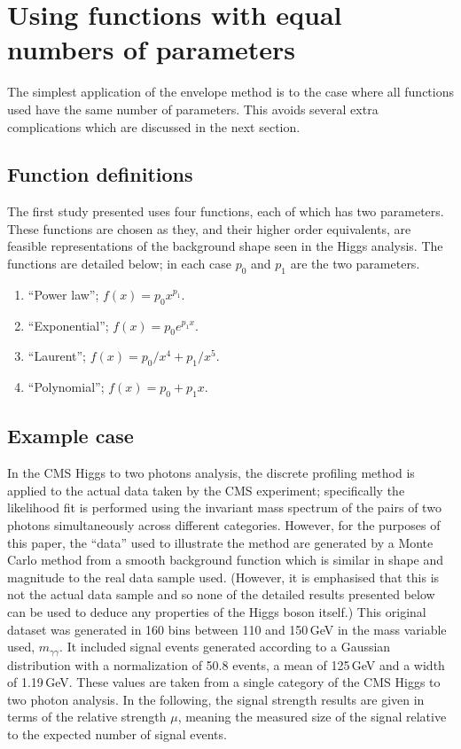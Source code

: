 \section{Using functions with equal numbers of parameters} %
\label{sec:functions}

The simplest application of the envelope method is to the case where all
functions used have the same number of parameters. This avoids several extra
complications which are discussed in the next section.

\subsection{Function definitions}
\label{sec:functions:function}

The first study presented uses four functions, each of which has two parameters.
These functions are chosen as they, and their higher order equivalents,
are feasible representations of the background shape seen in the Higgs
analysis. The functions are detailed below; in each case $p_0$ and $p_1$ are
the two parameters.
\begin{enumerate}
\item
``Power law''; $f(x) = p_0 x^{p_1}$.
\item
``Exponential''; $f(x) = p_0 e^{p_1x}$.
\item
``Laurent''; $f(x) = p_0/x^4 + p_1/x^5$.
\item
``Polynomial''; $f(x) = p_0 + p_1 x$.
\end{enumerate}

\subsection{Example case}
\label{sec:functions:example}

In the CMS Higgs to two photons analysis, the discrete profiling method is applied to
the actual data taken by the CMS experiment; specifically the likelihood fit
is performed using the invariant mass spectrum of the pairs of two photons simultaneously 
across different categories. 
However, for the purposes of this
paper, the ``data'' used to illustrate the method are generated by a Monte Carlo
method from a smooth background
function which is similar in shape and magnitude to the
real data sample used. (However, it is emphasised that this is not the 
actual data sample and so 
none of the detailed results presented below can be used to deduce any
properties of the Higgs boson itself.)
This original dataset was generated in 160 bins between 110 and 150\,GeV in
the mass variable used, $m_{\gamma\gamma}$.
It included signal events
generated according to a Gaussian distribution with a normalization of 50.8 events, a mean of 125\,GeV and a 
width of 1.19\,GeV. These values are taken from a single category of the CMS Higgs to two photon analysis.
In the following, the signal strength results are given in
terms of the relative strength $\mu$, 
meaning the measured size of the signal relative
to the expected number of signal events. 

